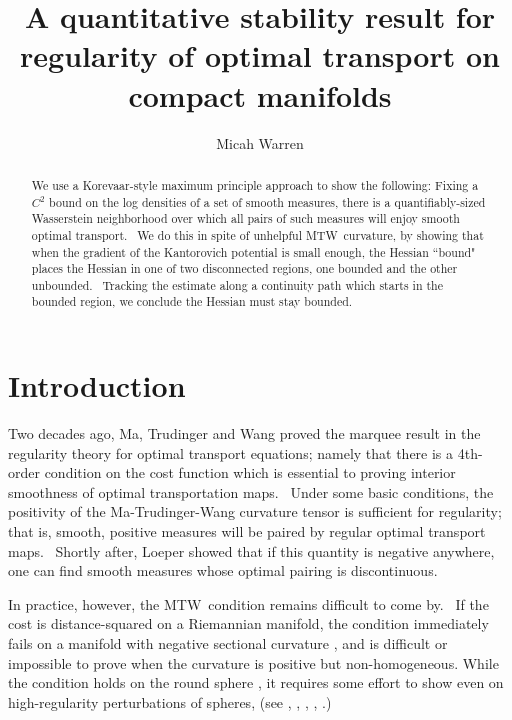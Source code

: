 \documentclass[11pt,letterpaper]{amsart}%
\numberwithin{equation}{section}
\begin{document}
\title[stability of optimal transport regularity ]{A quantitative stability result for regularity of optimal
transport on compact manifolds}
\author{Micah Warren}
\address{Department of Mathematics\\
University of Oregon, Eugene, OR 97403}

\begin{abstract}
We use a Korevaar-style maximum principle approach to show the following:
Fixing a $C^{2}$ bound on the log densities of a set of smooth measures, there is a
quantifiably-sized Wasserstein neighborhood over which all pairs of such measures will enjoy
smooth optimal transport. \ We do this in spite of unhelpful
MTW\ curvature, by showing that when the gradient of the Kantorovich potential is small enough, the Hessian ``bound"
places the Hessian in one of two disconnected regions, one bounded and the
other unbounded. \ Tracking  the estimate along a continuity path which starts
in the bounded region, we conclude the Hessian must stay bounded.

\end{abstract}


\maketitle
\section{Introduction}
Two decades ago, Ma, Trudinger and Wang \cite{MTW} proved the marquee result in the
regularity theory for optimal transport equations; namely that there is a 4th-order condition on the cost function which is essential to proving interior
smoothness of optimal transportation maps. \ Under some basic 
conditions, the positivity of the Ma-Trudinger-Wang curvature tensor is sufficient for regularity; that is, smooth, positive measures will be paired by regular
optimal transport maps. \ Shortly after, Loeper \cite{Loeper} showed that if
this quantity is negative anywhere, one can find smooth measures whose optimal
pairing is discontinuous. 

In practice, however, the MTW\ condition remains difficult to come by. \ If
the cost is distance-squared on a Riemannian manifold, the condition immediately fails on a manifold
with negative sectional curvature  \cite{Loeper}, and is difficult or impossible to prove when the curvature is
positive but non-homogeneous. While the condition holds on the round sphere \cite{DL2006}, it requires some effort to show even on high-regularity perturbations of spheres, (see \cite{DG}, \cite{LV1}, \cite{FR}, \cite{FRV}, \cite{GeYe}.)   
\end{document}
